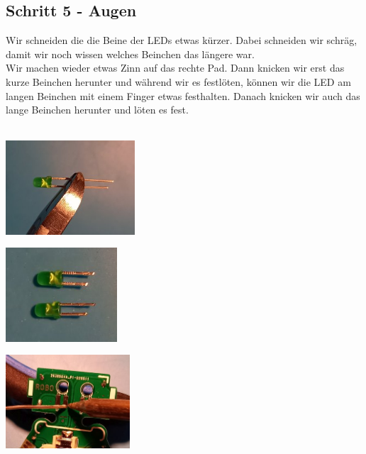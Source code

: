 \documentclass[a4paper]{article}
\begin{document}
\subsection{Schritt 5 - Augen}
Wir schneiden die die Beine der LEDs etwas kürzer. Dabei schneiden wir schräg, damit wir noch wissen welches Beinchen das längere war.\\ Wir machen wieder etwas Zinn auf das rechte Pad. Dann knicken wir erst das kurze Beinchen herunter und während wir es festlöten, können wir die LED am langen Beinchen mit einem Finger etwas festhalten. Danach knicken wir auch das lange Beinchen herunter und löten es fest.\\
\ \\
\begin{minipage}[t]{0.33\textwidth}
  \centering
  \includegraphics[height=3.5cm]{../pictures/LED4.jpg}
  \label{img:LED4}
  \end{minipage}
\begin{minipage}[t]{0.33\textwidth}
  \centering
  \includegraphics[height=3.5cm]{../pictures/LED5.jpg}
  \label{img:LED5}
\end{minipage}
\begin{minipage}[t]{0.33\textwidth}
  \centering
  \includegraphics[height=3.5cm]{../pictures/LED6.jpg}
  \label{img:LED6}
\end{minipage}
\end{document}
